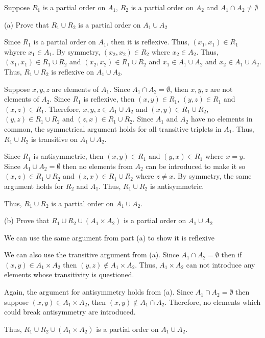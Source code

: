\documentclass[11pt]{article}
\begin{document}
Suppose $R_1$ is a partial order on $A_1$, $R_2$ is a partial order on $A_2$ 
and $A_1 \cap A_2 \neq \emptyset$

\noindent (a) Prove that $R_1 \cup R_2$ is a partial order on $A_1 \cup A_2$

Since $R_1$ is a partial order on $A_1$, then it is reflexive. Thus, 
$(x_1, x_1) \in R_1$ whyere $x_1 \in A_1$. By symmetry, $(x_2, x_2) \in R_2$
where $x_2 \in A_2$. Thus, $(x_1, x_1) \in R_1 \cup R_2$ and 
$(x_2, x_2) \in R_1 \cup R_2$ and $x_1 \in A_1 \cup A_2$ and 
$x_2 \in A_1 \cup A_2$. Thus, $R_1 \cup R_2$ is reflexive on $A_1 \cup A_2$.

Suppose $x,y,z$ are elements of $A_1$. Since $A_1 \cap A_2 = \emptyset$, then
$x,y,z$ are not elements of $A_2$. Since $R_1$ is reflexive, then 
$(x,y) \in R_1$, $(y,z) \in R_1$ and $(x,z) \in R_1$. 
Therefore, $x,y,z \in A_1 \cup A_2$ and $(x,y) \in R_1 \cup R_2$, 
$(y,z) \in R_1 \cup R_2$ and $(z,x) \in R_1 \cup R_2$. Since $A_1$ and $A_2$ have
no elements in common, the symmetrical argument holds for all transitive 
triplets in $A_1$. Thus, $R_1 \cup R_2$ is transitive on $A_1 \cup A_2$.

Since $R_1$ is antisymmetric, then $(x,y) \in R_1$ and $(y,x) \in R_1$ where
$x=y$. Since $A_1 \cup A_2 = \emptyset$ then no elements from $A_2$ can be 
introduced to make it so $(x,z) \in R_1 \cup R_2$ and $(z,x) \in R_1 \cup R_2$ 
where $z \neq x$. By symmetry, the same argument holds for $R_2$ and $A_1$. Thus,
$R_1 \cup R_2$ is antisymmetric. 

Thus, $R_1 \cup R_2$ is a partial order on $A_1 \cup A_2$.

\noindent (b) Prove that $R_1 \cup R_2 \cup (A_1 \times A_2)$ is a partial 
order on $A_1 \cup A_2$

We can use the same argument from part (a) to show it is reflexive 

We can also use the transitive argument from (a). Since $A_1 \cap A_2 = \emptyset$
then if $(x, y) \in A_1 \times A_2$ then $(y,z) \notin A_1 \times A_2$. Thus,
$A_1 \times A_2$ can not introduce any elements whose transitivity is questioned.

Again, the argument for antisymmetry holds from (a). Since $A_1 \cap A_2 = \emptyset$
then suppose $(x,y) \in A_1 \times A_2$, then $(x, y) \notin A_1 \cap A_2$.
Therefore, no elements which could break antisymmetry are introduced.

Thus, $R_1 \cup R_2 \cup (A_1 \times A_2)$ is a partial order on $A_1 \cup A_2$.
\end{document}
